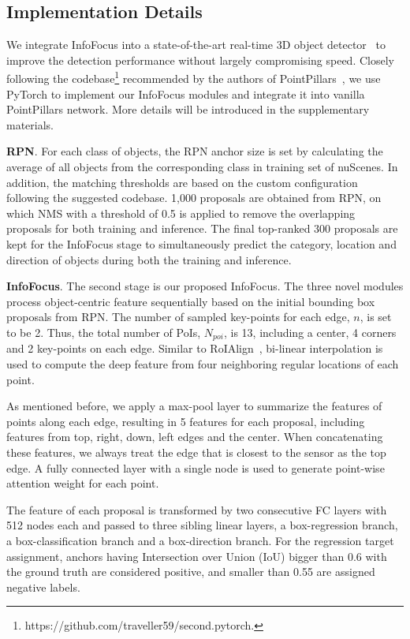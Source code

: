 \documentclass[runningheads]{llncs}
\begin{document}
\subsection{Implementation Details}
We integrate InfoFocus into a state-of-the-art real-time 3D object detector~\cite{lang2019PointPillars} to improve the detection performance without largely compromising speed. Closely following the codebase\footnote{https://github.com/traveller59/second.pytorch.} recommended by the authors of PointPillars~\cite{lang2019PointPillars}, we use PyTorch to implement our InfoFocus modules and integrate it into vanilla PointPillars network. More details will be introduced in the supplementary materials. 

\noindent\textbf{RPN}. For each class of objects, the RPN anchor size is set by calculating the average of all objects from the corresponding class in training set of nuScenes. In addition, the matching thresholds are based on the custom configuration following the suggested codebase. 1,000 proposals are obtained from RPN, on which NMS with a threshold of 0.5 is applied to remove the overlapping proposals for both training and inference. The final top-ranked 300 proposals are kept for the InfoFocus stage to simultaneously predict the category, location and direction of objects during both the training and inference.

\noindent\textbf{InfoFocus}. The second stage is our proposed InfoFocus. The three novel modules process object-centric feature sequentially based on the initial bounding box proposals from RPN. The number of sampled key-points for each edge, $n$, is set to be 2. Thus, the total number of PoIs, $N_{poi}$, is 13, including a center, 4 corners and 2 key-points on each edge. Similar to RoIAlign~\cite{he2017mask}, bi-linear interpolation is used to compute the deep feature from four neighboring regular locations of each point.

As mentioned before, we apply a max-pool layer to summarize the features of points along each edge, resulting in 5 features for each proposal, including features from top, right, down, left edges and the center. When concatenating these features, we always treat the edge that is closest to the sensor as the top edge. A fully connected layer with a single node is used to generate point-wise attention weight for each point.

The feature of each proposal is transformed by two consecutive FC layers with 512 nodes each and passed to three sibling linear layers, a box-regression branch, a box-classification branch and a box-direction branch. For the regression target assignment, anchors having Intersection over Union (IoU) bigger than 0.6 with the ground truth are considered positive, and smaller than 0.55 are assigned negative labels. 
\end{document}
